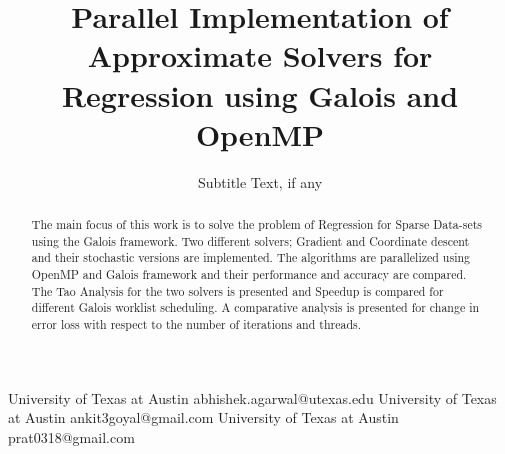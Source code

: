 \documentclass{sigplanconf}
\begin{document}
\setlength{\pdfpageheight}{\paperheight}
\setlength{\pdfpagewidth}{\paperwidth}






\title{Parallel Implementation of Approximate Solvers for Regression using Galois and OpenMP}
\subtitle{Subtitle Text, if any}

           {University of Texas at Austin}
           {abhishek.agarwal@utexas.edu}
           {University of Texas at Austin}
           {ankit3goyal@gmail.com}
           {University of Texas at Austin}
           {prat0318@gmail.com}

\maketitle

\begin{abstract}
The main focus of this work is to solve the problem of Regression for Sparse Data-sets using the Galois framework.
Two different solvers; Gradient and Coordinate descent and their stochastic versions are implemented. The
algorithms are parallelized using OpenMP and Galois framework and their performance and accuracy are compared.
The Tao Analysis for the two solvers is presented and Speedup is compared for different Galois worklist scheduling. A
comparative analysis is presented for change in error loss with respect to the number of iterations and threads. 
\end{abstract}

\end{document}
